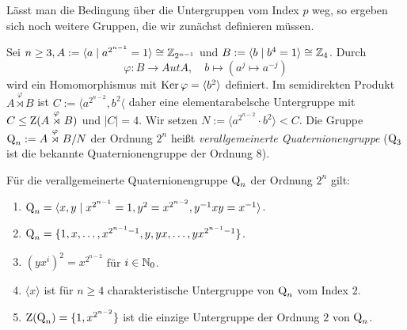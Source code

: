 L\"asst man die Bedingung \"uber die Untergruppen vom Index $p$ weg, so ergeben sich noch weitere Gruppen, die wir zun\"achst definieren m\"ussen.
\begin{definition}
Sei $n\geq 3, A:=\langle a\mid a^{2^{n-1}}=1\rangle\cong \mathbb{Z}_{2^{n-1}}$ und $B:=\langle b\mid b^4=1\rangle\cong \mathbb{Z}_4$. Durch 
$$\varphi:B\to Aut A,\quad b\longmapsto(a^j\mapsto a^{-j})$$ wird ein Homomorphismus mit $\operatorname{Ker}\varphi=\langle b^2\rangle$ definiert. Im semidirekten Produkt $A\stackrel{\varphi}{\rtimes}B$ ist $C:=\langle a^{2^{n-2}}, b^2\langle$ daher eine elementarabelsche Untergruppe mit $C\leq \operatorname{Z}(A\stackrel{\varphi}{\rtimes}B)$ und $|C|=4$. Wir setzen $N:=\langle a^{2^{n-2}}\cdot b^2\rangle < C$. Die Gruppe $\operatorname{Q}_n:=A\stackrel{\varphi}{\rtimes}B/N$ der Ordnung $2^n$ hei\ss{}t \emph{verallgemeinerte Quaternionengruppe} ($\operatorname{Q}_3$ ist die bekannte Quaternionengruppe der Ordnung $8$).
\end{definition}

\begin{satz}
F\"ur die verallgemeinerte Quaternionengruppe $\operatorname{Q}_n$ der Ordnung $2^n$ gilt:
\begin{enumerate}
 \item $\operatorname{Q}_n=\langle x,y\mid x^{2^{n-1}}=1, y^2=x^{2^{n-2}}, y^{-1}xy=x^{-1}\rangle$.
 \item $\operatorname{Q}_n=\lbrace 1, x,\ldots, x^{2^{n-1}-1},y,yx,\ldots,yx^{2^{n-1}-1}\rbrace$.
 \item \label{10.10.3}$(yx^i)^2=x^{2^{n-2}}$ f\"ur $i\in \mathbb{N}_0$.
 \item $\langle x\rangle$ ist f\"ur $n\geq 4$ charakteristische Untergruppe von $\operatorname{Q}_n$ vom Index $2$.
 \item \label{10.10.5}$\operatorname{Z}(\operatorname{Q}_n)=\lbrace 1, x^{2^{n-2}}\rbrace$ ist die einzige Untergruppe der Ordnung $2$ von $\operatorname{Q}_n$.
\end{enumerate}

\end{satz}

